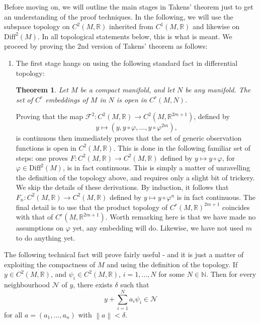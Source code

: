 \documentclass[11pt, a4paper]{memoir}
\theoremstyle{break}
\newtheorem{thm}{Theorem}
\theoremstyle{break}
\theoremstyle{nonumberplain}
\newcommand{\mN}{\mathbb{N}}
\newcommand{\mR}{\mathbb{R}}
\newcommand{\norm}[1]{\left\lVert#1\right\rVert}
\begin{document}
Before moving on, we will outline the main stages in Takens' theorem just to get an understanding of the proof techniques. In the following, we will use the subspace topology on $C^2(M,\mR)$ inherited from $C^1(M,\mR)$ and likewise on $\text{Diff}^2(M)$. In all topological statements below, this is what is meant. We proceed by proving the 2nd version of Takens' theorem as follows:
\begin{enumerate}[label=\roman*)]
	\item The first stage hangs on using the following standard fact in differential topology:
	\begin{thm}
	Let $M$ be a compact manifold, and let $N$ be any manifold. The set of $C^r$ embeddings of $M$ in $N$ is open in $C^r(M,N)$. \cite{hirsch}
	\end{thm}
	Proving that the map $\mathcal{F}^2: C^2(M,\mR)\to C^2(M,\mR^{2m+1})$, defined by $$y\mapsto (y,y\circ\varphi,\ldots, y\circ \varphi^{2m}),$$ 
	is continuous then immediately proves that the set of generic observation functions is open in $C^2(M,\mR)$. This is done in the following familiar set of steps: one proves $F: C^2(M,\mR)\to C^2(M,\mR)$ defined by $y\mapsto y\circ\varphi$, for $\varphi\in \text{Diff}^2(M)$, is in fact continuous.  This is simply a matter of unravelling the definition of the topology above, and requires only a slight bit of trickery. We skip the details of these derivations. By induction, it follows that $F_n:  C^2(M,\mR)\to C^2(M,\mR)$ defined by $y\mapsto y\circ\varphi^n$ is in fact continuous.  The final detail is to use that the product topology of $C^r(M,\mR)^{2m+1}$ coincides with that of $C^r(M,\mR^{2m+1})$. Worth remarking here is that we have made no assumptions on $\varphi$ yet, any embedding will do. Likewise, we have not used $m$ to do anything yet. 
\end{enumerate}
The following technical fact will prove fairly useful - and it is just a matter of exploiting the compactness of $M$ and using the definition of the topology. If $y\in C^2(M,\mR)$, and $\psi_i\in C^2(M,\mR)$, $i=1,\ldots,N$ for some $N\in \mN$. Then for every neighbourhood $\mathcal{N}$ of $y$, there exists $\delta$ such that
$$y+\sum_{i=1}^N a_i\psi_i\in \mathcal{N}$$
for all $a=(a_1,\ldots,a_n)$ with $\norm{a}< \delta$. 
\end{document}
